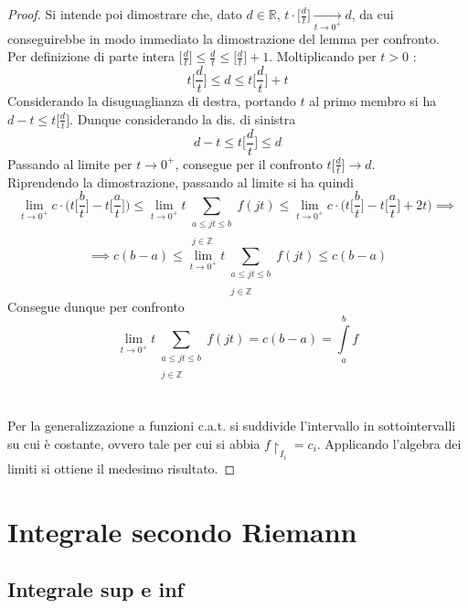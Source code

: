 \documentclass[10pt, oneside]{book}
\theoremstyle{plain}
\begin{document}
\begin{proof}
    Si intende poi dimostrare che, dato $d \in \mathbb{R}$, $t \cdot \big[ \frac{d}{t}\big] \xrightarrow[t \rightarrow 0^+]{} d$, da cui conseguirebbe in modo immediato la dimostrazione del lemma per confronto.
    \\Per definizione di parte intera $\big[\frac{d}{t}\big] \leq \frac{d}{t} \leq \big[\frac{d}{t}\big] + 1$. Moltiplicando per $t > 0$ :
    \[t \big[\frac{d}{t}\big] \leq d \leq t \big[\frac{d}{t}\big] + t\]
    Considerando la disuguaglianza di destra, portando $t$ al primo membro si ha $d - t \leq t \big[\frac{d}{t}\big]$. Dunque considerando la dis. di sinistra
    \[d - t \leq t \big[\frac{d}{t}\big] \leq d\]
    Passando al limite per $t \rightarrow 0^+$, consegue per il confronto $t \big[\frac{d}{t}\big] \rightarrow d$. 
    \\Riprendendo la dimostrazione, passando al limite si ha quindi 
    \[\lim \limits_{t \rightarrow 0^+} c \cdot \bigg(t \big[\frac{b}{t}\big] - t \big[\frac{a}{t}\big]\bigg) \leq \lim \limits_{t \rightarrow 0^+} t \sum_{\substack{a \leq jt \leq b \\~\\ j \in \mathbb{Z}}} f(jt) \leq \lim \limits_{t \rightarrow 0^+} c \cdot \bigg(t \big[\frac{b}{t}\big] - t \big[\frac{a}{t}\big] + 2t \bigg) \implies\]
    \[\implies c(b - a) \leq \lim \limits_{t \rightarrow 0^+} t \sum_{\substack{a \leq jt \leq b \\~\\ j \in \mathbb{Z}}} f(jt) \leq c(b - a)\]
    Consegue dunque per confronto
    \[\lim \limits_{t \rightarrow 0^+} t \sum_{\substack{a \leq jt \leq b \\~\\ j \in \mathbb{Z}}} f(jt) = c (b - a) = \int\limits_{a}^{b} f\]
    \\~\\Per la generalizzazione a funzioni c.a.t. si suddivide l'intervallo in sottointervalli su cui è costante, ovvero tale per cui si abbia $f \restriction_{I_i} = c_i$. Applicando l'algebra dei limiti si ottiene il medesimo risultato.
\end{proof}

\section{Integrale secondo Riemann}

\subsection{Integrale sup e inf}
\end{document}
